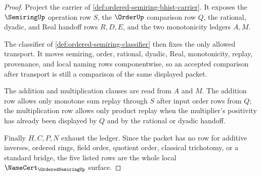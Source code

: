\begin{proof}
Project the carrier of \autoref{def:ordered-semiring-bhist-carrier}. It exposes the $\SemiringUp$ operation row $S$, the $\OrderUp$ comparison row $Q$, the rational, dyadic, and Real handoff rows $R,D,E$, and the two monotonicity ledgers $A,M$.

The classifier of \autoref{def:ordered-semiring-classifier} then fixes the only allowed transport. It moves semiring, order, rational, dyadic, Real, monotonicity, replay, provenance, and local naming rows componentwise, so an accepted comparison after transport is still a comparison of the same displayed packet.

The addition and multiplication clauses are read from $A$ and $M$. The addition row allows only monotone sum replay through $S$ after input order rows from $Q$; the multiplication row allows only product replay when the multiplier's positivity has already been displayed by $Q$ and by the rational or dyadic handoff.

Finally $H,C,P,N$ exhaust the ledger. Since the packet has no row for additive inverses, ordered rings, field order, quotient order, classical trichotomy, or a standard bridge, the five listed rows are the whole local $\NameCert_{\OrderedSemiringUp}$ surface.
\end{proof}

